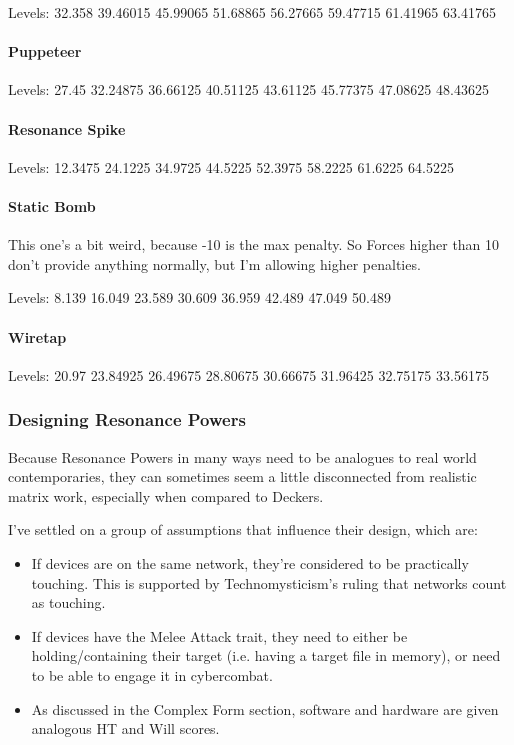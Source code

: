 \begin{multicols*}{2}
	Levels: 32.358 39.46015 45.99065 51.68865 56.27665 59.47715 61.41965 63.41765
	
	\paragraph{Puppeteer}
	Levels: 27.45 32.24875 36.66125 40.51125 43.61125 45.77375 47.08625 48.43625
	
	\paragraph{Resonance Spike}
	
	Levels: 12.3475 24.1225 34.9725 44.5225 52.3975 58.2225 61.6225 64.5225
	
	\paragraph{Static Bomb}
	This one's a bit weird, because -10 is the max penalty. So Forces higher than 10 don't provide anything normally, but I'm allowing higher penalties.
	
	Levels: 8.139 16.049 23.589 30.609 36.959 42.489 47.049 50.489
	
	\paragraph{Wiretap}
	Levels: 20.97 23.84925 26.49675 28.80675 30.66675 31.96425 32.75175 33.56175
	
	\subsubsection{Designing Resonance Powers}
	
	Because Resonance Powers in many ways need to be analogues to real world contemporaries, they can sometimes seem a little disconnected from realistic matrix work, especially when compared to Deckers.
	
	I've settled on a group of assumptions that influence their design, which are:
	
	\begin{itemize}
		\item If devices are on the same network, they're considered to be practically touching. This is supported by Technomysticism's ruling that networks count as touching.
		\item If devices have the Melee Attack trait, they need to either be holding/containing their target (i.e. having a target file in memory), or need to be able to engage it in cybercombat.
		\item As discussed in the Complex Form section, software and hardware are given analogous HT and Will scores.
	\end{itemize}
	

\end{multicols*}
